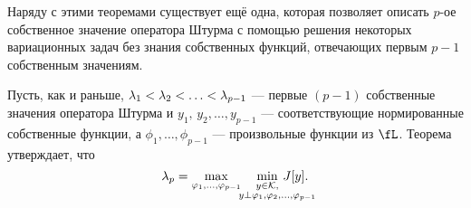 Наряду с этими теоремами существует ещё одна, которая позволяет описать $p$-ое собственное значение оператора Штурма с помощью решения некоторых вариационных задач без знания собственных функций, отвечающих первым $p-1$ собственным значениям.
\begin{Teor}
	\label{l5:s2:teor:4}
	Пусть{\mb,} как и раньше{\mb,} $\lambda_1<\lambda_2\?<\ldots<\lambda_{p-1}$ --- первые $(p-1)$ собственные значения оператора Штурма и $y_1,\,y_2,\ldots,y_{p-1}$ --- соответствующие нормированные собственные функции, а $\phi_1,\ldots,\phi_{p-1}$ --- произвольные функции из $\fL$. Теорема утверждает, что
	\begin{equation}
		\label{l5:eq:12}
		\lambda_p=\max\limits_{\phi_1,\ldots,\phi_{p-1}}\quad\min\limits_{\substack{y\in\K,\\\lefteqn{\scriptstyle \hspace*{-0.8cm}y\perp\phi_1,\phi_2,\ldots,\phi_{p-1}}}}\,J[y].
	\end{equation}
\end{Teor}

